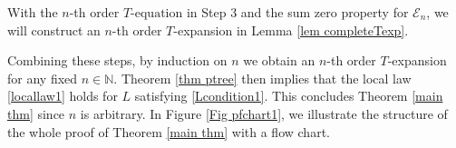 \documentclass{article}
\newcommand{\1}{\mathds{1}}
\numberwithin{equation}{section}
\newcommand{\N}{\mathbb{N}}
\theoremstyle{plain} %
\theoremstyle{remark}
\newcommand{\Sinfty}{\Sigma^{\infty}}
\newcommand{\Sele}{{\mathcal E}}
\newcommand{\incomp}{{\text{$T$-equation}}}
\begin{document}
\vspace{5pt}

 With the $n$-th order $\incomp$ in Step 3 and the sum zero property for $\Sele_n$, we will construct an $n$-th order $T$-expansion in Lemma \ref{lem completeTexp}.  

 
\vspace{5pt}

\noindent Combining these steps, by induction on $n$ we obtain an $n$-th order $T$-expansion for any fixed $n\in \N$. Theorem \ref{thm ptree} then implies that the local law \eqref{locallaw1} holds for $L$ satisfying \eqref{Lcondition1}. This concludes Theorem \ref{main thm} since $n$ is arbitrary. In Figure \ref{Fig pfchart1}, we illustrate the structure of the whole proof of Theorem \ref{main thm} with a flow chart. 

 
\end{document}
